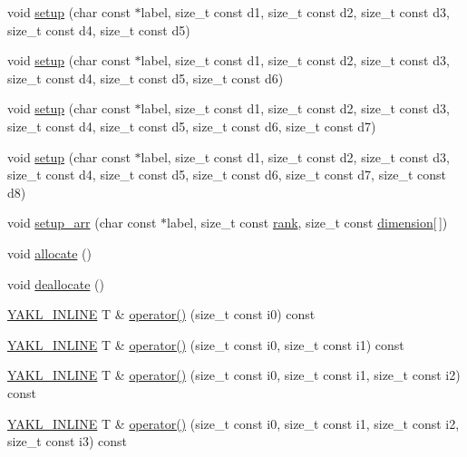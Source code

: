 \begin{DoxyCompactItemize}
void \hyperlink{classyakl_1_1Array_a5767b7a3c6403b9fe168065a51464b18}{setup} (char const $\ast$label, size\+\_\+t const d1, size\+\_\+t const d2, size\+\_\+t const d3, size\+\_\+t const d4, size\+\_\+t const d5)
\item 
void \hyperlink{classyakl_1_1Array_a826e9f4fdeada27345cd8a4a0d009a2e}{setup} (char const $\ast$label, size\+\_\+t const d1, size\+\_\+t const d2, size\+\_\+t const d3, size\+\_\+t const d4, size\+\_\+t const d5, size\+\_\+t const d6)
\item 
void \hyperlink{classyakl_1_1Array_ab5f969be895579e32b5e506a70edd471}{setup} (char const $\ast$label, size\+\_\+t const d1, size\+\_\+t const d2, size\+\_\+t const d3, size\+\_\+t const d4, size\+\_\+t const d5, size\+\_\+t const d6, size\+\_\+t const d7)
\item 
void \hyperlink{classyakl_1_1Array_a2ea97ac7cd33db73f3e5bc9858b0c619}{setup} (char const $\ast$label, size\+\_\+t const d1, size\+\_\+t const d2, size\+\_\+t const d3, size\+\_\+t const d4, size\+\_\+t const d5, size\+\_\+t const d6, size\+\_\+t const d7, size\+\_\+t const d8)
\item 
void \hyperlink{classyakl_1_1Array_a9582283a5ac0d9f89cd80d41bc3d0273}{setup\+\_\+arr} (char const $\ast$label, size\+\_\+t const \hyperlink{classyakl_1_1Array_a3c50a377d5370bbff2ad29db3c5f544d}{rank}, size\+\_\+t const \hyperlink{classyakl_1_1Array_a0ccbe72c84f403916ede27ca59fadff5}{dimension}\mbox{[}$\,$\mbox{]})
\item 
void \hyperlink{classyakl_1_1Array_a81e69ab3f8c44bf08740b941cc30d417}{allocate} ()
\item 
void \hyperlink{classyakl_1_1Array_af89254334573c3f25b83a15e6d9fbd5d}{deallocate} ()
\item 
\hyperlink{YAKL_8h_aa0dd629ffce6d564b19e9313fb91a5ad}{Y\+A\+K\+L\+\_\+\+I\+N\+L\+I\+NE} T \& \hyperlink{classyakl_1_1Array_abd51e7fc9377f49828732c6b4ca5f53a}{operator()} (size\+\_\+t const i0) const
\item 
\hyperlink{YAKL_8h_aa0dd629ffce6d564b19e9313fb91a5ad}{Y\+A\+K\+L\+\_\+\+I\+N\+L\+I\+NE} T \& \hyperlink{classyakl_1_1Array_a81dec897528782d71fda9fbd6a1bfd44}{operator()} (size\+\_\+t const i0, size\+\_\+t const i1) const
\item 
\hyperlink{YAKL_8h_aa0dd629ffce6d564b19e9313fb91a5ad}{Y\+A\+K\+L\+\_\+\+I\+N\+L\+I\+NE} T \& \hyperlink{classyakl_1_1Array_aaa835a0783d5f01a0909d96d2d42d725}{operator()} (size\+\_\+t const i0, size\+\_\+t const i1, size\+\_\+t const i2) const
\item 
\hyperlink{YAKL_8h_aa0dd629ffce6d564b19e9313fb91a5ad}{Y\+A\+K\+L\+\_\+\+I\+N\+L\+I\+NE} T \& \hyperlink{classyakl_1_1Array_afb9a5d745da5ef356b680b89daaccd72}{operator()} (size\+\_\+t const i0, size\+\_\+t const i1, size\+\_\+t const i2, size\+\_\+t const i3) const

\end{DoxyCompactItemize}
